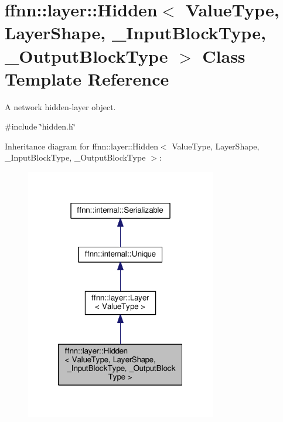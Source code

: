 \hypertarget{classffnn_1_1layer_1_1_hidden}{\section{ffnn\-:\-:layer\-:\-:Hidden$<$ Value\-Type, Layer\-Shape, \-\_\-\-Input\-Block\-Type, \-\_\-\-Output\-Block\-Type $>$ Class Template Reference}
\label{classffnn_1_1layer_1_1_hidden}
}


A network hidden-\/layer object.  




{\ttfamily \#include \char`\"{}hidden.\-h\char`\"{}}



Inheritance diagram for ffnn\-:\-:layer\-:\-:Hidden$<$ Value\-Type, Layer\-Shape, \-\_\-\-Input\-Block\-Type, \-\_\-\-Output\-Block\-Type $>$\-:\nopagebreak
\begin{figure}[H]
\begin{center}
\leavevmode
\includegraphics[width=236pt]{classffnn_1_1layer_1_1_hidden__inherit__graph}
\end{center}
\end{figure}


